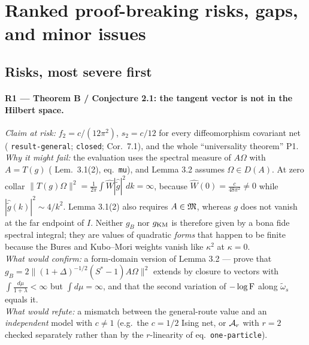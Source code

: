 \documentclass[11pt]{article}
\newcommand{\gt}{\widetilde g}
\newcommand{\Wh}{\widehat W}
\newcommand{\gh}{\widehat{\gt}}
\begin{document}
\clearpage
\section{Ranked proof-breaking risks, gaps, and minor issues}

\subsection{Risks, most severe first}

\paragraph{R1 --- \NVII{} Theorem B / \NVI{} Conjecture 2.1: the tangent vector is not in the Hilbert space.}
\emph{Claim at risk:} $f_2=c/(12\pi^2)$, $s_2=c/12$ for every diffeomorphism covariant net (\NVII{} \texttt{result-\allowbreak general};
\NVI{} \texttt{closed}; \NVII{} Cor.~7.1), and the whole ``universality theorem'' P1.\\
\emph{Why it might fail:} the evaluation uses the spectral measure of $A\Omega$ with $A=T(g)$ (\NVII{} Lem.~3.1(2),
eq.~\texttt{mu}), and Lemma 3.2 assumes $\Omega\in D(A)$.  At zero collar
$\|T(g)\Omega\|^2=\frac1{2\pi}\int\Wh|\gh|^2dk=\infty$, because $\Wh(0)=\frac c{48\pi^2}\ne0$ while
$|\gh(k)|^2\sim4/k^2$.  Lemma 3.1(2) also requires $A\in\mathfrak M$, whereas $g$ does not vanish at the far endpoint of $I$.
Neither $g_B$ nor $g_{\rm KM}$ is therefore given by a bona fide spectral integral; they are values of quadratic
\emph{forms} that happen to be finite because the Bures and Kubo--Mori weights vanish like $\kappa^2$ at $\kappa=0$.\\
\emph{What would confirm:} a form-domain version of Lemma 3.2 --- prove that
$g_B=2\|(1+\Delta)^{-1/2}(S^*-1)A\Omega\|^2$ extends by closure to vectors with $\int\frac{d\mu}{1+\lambda}<\infty$
but $\int d\mu=\infty$, and that the second variation of $-\log\operatorname{F}$ along $\widetilde\omega_s$ equals it.\\
\emph{What would refute:} a mismatch between the general-route value and an \emph{independent} model with $c\ne1$
(e.g.\ the $c=1/2$ Ising net, or $\mathcal A_r$ with $r=2$ checked separately rather than by the $r$-linearity of
eq.~\texttt{one-particle}).
\end{document}
